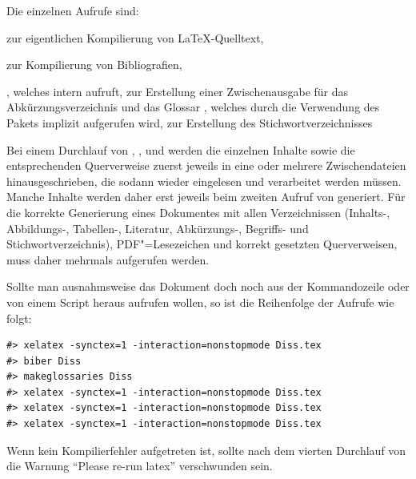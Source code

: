 Die einzelnen Aufrufe sind:
\begin{itemize*}
\item {} zur eigentlichen Kompilierung von \LaTeX-Quelltext,
\item {} zur Kompilierung von Bibliografien,
\item {}, welches intern  aufruft,
zur Erstellung einer Zwischenausgabe für das Abkürzungsverzeichnis und das Glossar
, welches durch die Verwendung des Pakets  implizit aufgerufen wird, zur Erstellung des Stichwortverzeichnisses
\end{itemize*}
Bei einem Durchlauf von , ,  und 
werden die einzelnen Inhalte sowie die entsprechenden Querverweise
zuerst jeweils in eine oder mehrere Zwischendateien hinausgeschrieben,
die sodann wieder eingelesen und verarbeitet werden müssen.
Manche Inhalte werden daher erst jeweils beim zweiten Aufruf von  generiert.
Für die korrekte Generierung eines Dokumentes mit allen Verzeichnissen
(Inhalts-, Abbildungs-, Tabellen-, Literatur, Abkürzungs-, Begriffs- und Stichwortverzeichnis),
PDF"=Lesezeichen und korrekt gesetzten Querverweisen,
muss  daher mehrmals aufgerufen werden.

Sollte man ausnahmsweise das Dokument doch noch aus der Kommandozeile oder von einem Script heraus aufrufen wollen,
so ist die Reihenfolge der Aufrufe wie folgt:
\begin{verbatim}
#> xelatex -synctex=1 -interaction=nonstopmode Diss.tex
#> biber Diss
#> makeglossaries Diss
#> xelatex -synctex=1 -interaction=nonstopmode Diss.tex
#> xelatex -synctex=1 -interaction=nonstopmode Diss.tex
#> xelatex -synctex=1 -interaction=nonstopmode Diss.tex
\end{verbatim}

Wenn kein Kompilierfehler aufgetreten ist,
sollte nach dem vierten Durchlauf von  die
Warnung \enquote{Please re-run latex}
verschwunden sein.